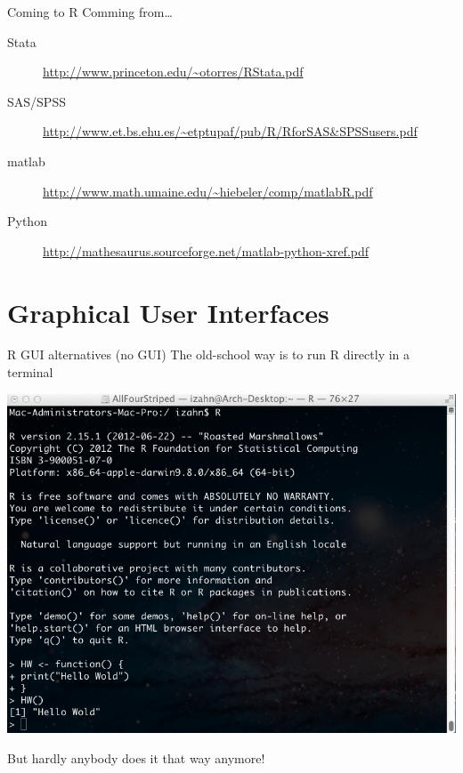 \documentclass[table,smaller]{beamer}
\begin{document}
\begin{frame}[label=sec-1-3]{Coming to R}
Comming from\ldots{}
{\footnotesize
\begin{description}
\item[{Stata}] \url{http://www.princeton.edu/~otorres/RStata.pdf}
\item[{SAS/SPSS}] \url{http://www.et.bs.ehu.es/~etptupaf/pub/R/RforSAS&SPSSusers.pdf}
\item[{matlab}] \url{http://www.math.umaine.edu/~hiebeler/comp/matlabR.pdf}
\item[{Python}] \url{http://mathesaurus.sourceforge.net/matlab-python-xref.pdf}
\end{description}
}
\end{frame}

\section{Graphical User Interfaces}
\label{sec-2}


\begin{frame}[label=sec-2-1]{R GUI alternatives (no GUI)}
The old-school way is to run R directly in a terminal

\includegraphics[width=.75\textwidth]{images/Rconsole.png}

But hardly anybody does it that way anymore!
\end{frame}
\end{document}
